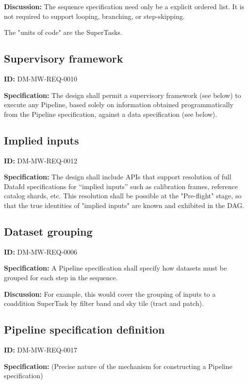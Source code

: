 \documentclass[SE,toc,lsstdraft]{lsstdoc}
\begin{document}
\textbf{Discussion:}
The sequence specification need only be a explicit ordered list.  It is not required to support looping, branching, or step-skipping.

The "units of code" are the SuperTasks.

\subsection{Supervisory framework}

\label{DM-MW-REQ-0010}
\textbf{ID:} DM-MW-REQ-0010

\textbf{Specification:}
The design shall permit a supervisory framework (see below) to execute any Pipeline, based solely on information obtained programmatically from the Pipeline specification, against a data specification (see below).

\subsection{Implied inputs}

\label{DM-MW-REQ-0012}
\textbf{ID:} DM-MW-REQ-0012

\textbf{Specification:}
The design shall include APIs that support resolution of full DataId specifications for “implied inputs” such as calibration frames, reference catalog shards, etc. This resolution shall be possible at the "Pre-flight" stage, so that the true identities of "implied inputs" are known and exhibited in the DAG.

\subsection{Dataset grouping}

\label{DM-MW-REQ-0006}
\textbf{ID:} DM-MW-REQ-0006

\textbf{Specification:}
A Pipeline specification shall specify how datasets must be grouped for each step in the sequence.

\textbf{Discussion:}
For example, this would cover the grouping of inputs to a coaddition SuperTask by filter band and sky tile (tract and patch).

\subsection{Pipeline specification definition}

\label{DM-MW-REQ-0017}
\textbf{ID:} DM-MW-REQ-0017

\textbf{Specification:}
(Precise nature of the mechanism for constructing a Pipeline specification)
\end{document}
